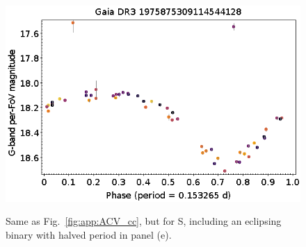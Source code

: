\documentclass[longauth]{aa}
\begin{document}
\begin{appendix}
\begin{figure}
\hspace{2mm}
 \includegraphics[width=0.45\hsize]{figures/appendix/STS-53.png} \\
\vspace{4mm}
 \caption{Same as Fig.~\ref{fig:app:ACV_cc}, but for S, including an eclipsing binary with halved period in panel (e).}
 \label{fig:app:S_cc}
\end{figure}




\end{appendix}
\end{document}
